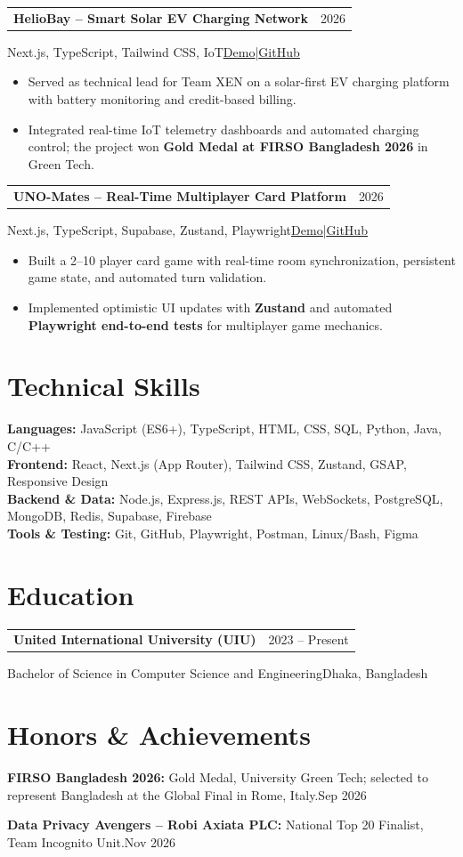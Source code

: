 \documentclass[letterpaper,11pt]{article}
\makeatletter
\newcommand{\entry}[2]{%
  \begin{tabularx}{\linewidth}{@{}Xr@{}}\textbf{#1} & #2\end{tabularx}\par
}
\newcommand{\project}[4]{%
  \entry{#1}{#2}
  {\small #3\hfill #4}\par
}
\makeatother
\begin{document}
\project{HelioBay -- Smart Solar EV Charging Network}{2026}
  {Next.js, TypeScript, Tailwind CSS, IoT}
  {\href{https://heliobay.vercel.app/}{\underline{Demo}}\enspace|\enspace\href{https://github.com/0xFaysal/HelioBay}{\underline{GitHub}}}
\begin{itemize}\small
  \item Served as technical lead for Team XEN on a solar-first EV charging platform with battery monitoring and credit-based billing.
  \item Integrated real-time IoT telemetry dashboards and automated charging control; the project won \textbf{Gold Medal at FIRSO Bangladesh 2026} in Green Tech.
\end{itemize}

\project{UNO-Mates -- Real-Time Multiplayer Card Platform}{2026}
  {Next.js, TypeScript, Supabase, Zustand, Playwright}
  {\href{https://uno-mates.vercel.app}{\underline{Demo}}\enspace|\enspace\href{https://github.com/0xFaysal/UNO-Mates}{\underline{GitHub}}}
\begin{itemize}\small
  \item Built a 2--10 player card game with real-time room synchronization, persistent game state, and automated turn validation.
  \item Implemented optimistic UI updates with \textbf{Zustand} and automated \textbf{Playwright end-to-end tests} for multiplayer game mechanics.
\end{itemize}

\section{Technical Skills}
{\small
\textbf{Languages:} JavaScript (ES6+), TypeScript, HTML, CSS, SQL, Python, Java, C/C++\\[2pt]
\textbf{Frontend:} React, Next.js (App Router), Tailwind CSS, Zustand, GSAP, Responsive Design\\[2pt]
\textbf{Backend \& Data:} Node.js, Express.js, REST APIs, WebSockets, PostgreSQL, MongoDB, Redis, Supabase, Firebase\\[2pt]
\textbf{Tools \& Testing:} Git, GitHub, Playwright, Postman, Linux/Bash, Figma
}

\section{Education}
\entry{United International University (UIU)}{2023 -- Present}
{\small Bachelor of Science in Computer Science and Engineering\hfill Dhaka, Bangladesh}

\section{Honors \& Achievements}
{\small
\textbf{FIRSO Bangladesh 2026:} Gold Medal, University Green Tech; selected to represent Bangladesh at the Global Final in Rome, Italy.\hfill Sep 2026\par\vspace{3pt}
\textbf{Data Privacy Avengers -- Robi Axiata PLC:} National Top 20 Finalist, Team Incognito Unit.\hfill Nov 2026
}
\end{document}

